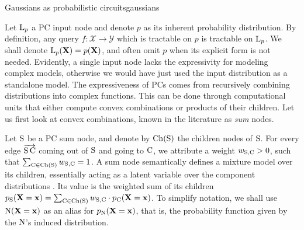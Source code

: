 \begin{example}[sidebyside,lefthand width=0.6\textwidth]{Gaussians as probabilistic circuits}{gaussians}
\begin{center}
  \end{center}
\end{example}
Let $\operatorname{\normalfont{L}}_p$ a PC input node and denote $p$ as its inherent probability distribution. By
definition, any query $f:\mathcal{X}\to \mathcal{Y}$ which is tractable on $p$ is tractable on
$\operatorname{\normalfont{L}}_p$. We shall denote $\operatorname{\normalfont{L}}_p(\mathbf{X})=p(\mathbf{X})$, and often omit $p$ when its explicit form
is not needed. Evidently, a single input node lacks the expressivity for modeling complex models, otherwise we
would have just used the input distribution as a standalone model. The expressiveness of PCs comes
from recursively combining distributions into complex functions. This can be done through
computational units that either compute convex combinations or products of their children. Let us
first look at convex combinations, known in the literature as \emph{sum} nodes.

Let $\operatorname{\normalfont{S}}$ be a PC sum node, and denote by $\operatorname*{\normalfont{Ch}}(\operatorname{\normalfont{S}})$ the children nodes of $\operatorname{\normalfont{S}}$. For every edge
$\overrightarrow{\operatorname{\normalfont{S}}\operatorname{\normalfont{C}}}$ coming out of $\operatorname{\normalfont{S}}$ and going to $\operatorname{\normalfont{C}}$, we attribute a weight $w_{\operatorname{\normalfont{S}},
\operatorname{\normalfont{C}}}>0$, such that $\sum_{\operatorname{\normalfont{C}}\in\operatorname*{\normalfont{Ch}}(\operatorname{\normalfont{S}})} w_{\operatorname{\normalfont{S}},\operatorname{\normalfont{C}}} = 1$. A sum node semantically
defines a mixture model over its children, essentially acting as a latent variable over the
component distributions \citep{poon11,peharz16}. Its value is the weighted sum of its children
$p_{\operatorname{\normalfont{S}}}(\mathbf{X}=\mathbf{x})=\sum_{\operatorname{\normalfont{C}}\in\operatorname*{\normalfont{Ch}}(\operatorname{\normalfont{S}})}w_{\operatorname{\normalfont{S}},\operatorname{\normalfont{C}}}\cdot
p_{\operatorname{\normalfont{C}}}(\mathbf{X}=\mathbf{x})$. To simplify notation, we shall use $\operatorname{\normalfont{N}}(\mathbf{X}=\mathbf{x})$ as an
alias for $p_{\operatorname{\normalfont{N}}}(\mathbf{X}=\mathbf{x})$, that is, the probability function given by the $\operatorname{\normalfont{N}}$'s
induced distribution.

